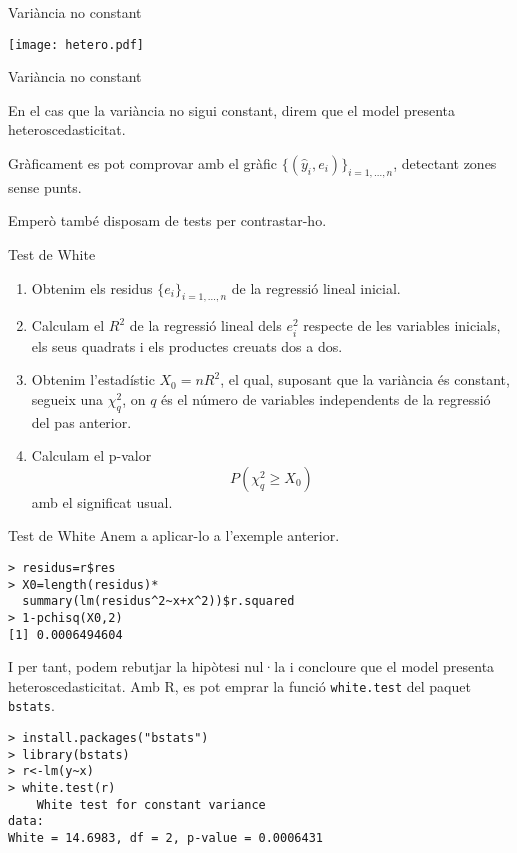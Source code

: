 \documentclass[12pt,t]{beamer}
\renewcommand{\emph}[1]{{\color{red}#1}}
\renewcommand{\geq}{\geqslant}
\theoremstyle{plain}
\theoremstyle{definition}
\begin{document}
\begin{frame}[fragile]{Variància no constant}
\begin{center}
\texttt{[image: hetero.pdf]}
\end{center}
\end{frame}

\begin{frame}{Variància no constant}

En el cas que la variància no sigui constant, direm que el model presenta \emph{heteroscedasticitat}.

\vspace{0.25cm}

Gràficament es pot comprovar amb el gràfic $\{(\hat{y}_i,e_i)\}_{i=1,\ldots,n}$, detectant zones sense punts.

\vspace{0.25cm}

Emperò també disposam de tests per contrastar-ho.

\end{frame}

\begin{frame}{Test de White}
\begin{enumerate}
\item Obtenim els residus $\{e_i\}_{i=1,\ldots,n}$  de la regressió lineal inicial.
\item Calculam el $R^2$ de la regressió lineal dels $e_i^2$ respecte de les variables inicials, els seus quadrats i els productes creuats dos a dos.
\item Obtenim l'estadístic $X_0=nR^2$, el qual, suposant que la variància és constant, segueix una $\chi^2_q$, on $q$ és el número de variables independents de la regressió del pas anterior.
\item Calculam el p-valor 
$$P(\chi_q^2\geq X_0)$$
 amb el significat usual.
\end{enumerate}
\end{frame}

\begin{frame}[fragile]{Test de White}
Anem a aplicar-lo a l'exemple anterior.

\begin{verbatim}
> residus=r$res
> X0=length(residus)*
  summary(lm(residus^2~x+x^2))$r.squared
> 1-pchisq(X0,2)
[1] 0.0006494604
\end{verbatim}

I per tant, podem rebutjar la hipòtesi nul·la i concloure que el model presenta heteroscedasticitat. Amb R, es pot emprar la funció \texttt{white.test} del paquet \texttt{bstats}.
\begin{footnotesize}
\begin{verbatim}
> install.packages("bstats")
> library(bstats)
> r<-lm(y~x)
> white.test(r)
	White test for constant variance
data:  
White = 14.6983, df = 2, p-value = 0.0006431
\end{verbatim}
\end{footnotesize}

\end{frame}
\end{document}
